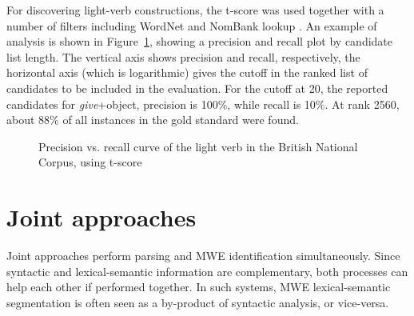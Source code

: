 \documentclass[output=paper]{langsci/langscibook}
\begin{document}
For discovering light-verb constructions, the t-score was used together with a number of filters including WordNet and NomBank lookup \citep{ronan_schneider_mwe_15}. 
An example of analysis is shown in Figure~\ref{con:discover-lightverbs}, showing a precision and recall plot by candidate list length. The vertical axis shows precision and recall, respectively, the horizontal axis (which is logarithmic) gives the cutoff in the ranked list of candidates to be included in the evaluation. For the cutoff at 20, the reported candidates for \emph{give}+object, precision is 100\%, while recall is 10\%. At rank 2560, about 88\% of all instances in the gold standard were found.

\begin{figure}
\caption{Precision vs. recall curve of the light verb  in the British National Corpus, using t-score \citep{ronan_schneider_mwe_15}}
\label{con:discover-lightverbs}
\end{figure}


%
\section{Joint approaches}
\label{con:sec:joint}

Joint approaches perform parsing and MWE identification simultaneously.
Since syntactic and lexical-semantic information are complementary, both processes can help each other if performed together.
In such systems, MWE lexical-seman\-tic segmentation is often seen as a by-product of syntactic analysis, or vice-versa.
\end{document}
